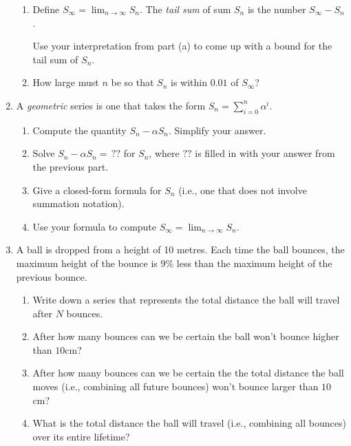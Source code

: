 \begin{enumerate}
\begin{enumerate}
            \item Define $S_\infty=\lim_{n\to\infty}S_n$. The \emph{tail sum} of sum $S_n$
			is the number $S_\infty - S_n$. 

			Use your interpretation from part (a) to come up with a bound for the tail sum of $S_n$.

            \item How large must $n$ be so that $S_n$ is within $0.01$ of $S_\infty$?
		\end{enumerate}

		\item A \emph{geometric} series is one that takes the form $\displaystyle S_n=\sum_{i=0}^n \alpha^i$.
		\begin{enumerate}
			\item Compute the quantity $S_n-\alpha S_n$. Simplify your answer.
			\item Solve $S_n-\alpha S_n=\,??$ for $S_n$, where $??$ is filled in with your answer from the previous part. 
			\item Give a closed-form formula for $S_n$ (i.e., one that does not involve summation notation).
			\item Use your formula to compute $S_\infty =\lim_{n\to\infty} S_n$.
		\end{enumerate}

        \item A ball is dropped from a height of 10 metres. Each time the ball bounces, the maximum height of the bounce is $9$\% less than the maximum height of the previous bounce. 
        
        \begin{enumerate}
            \item Write down a series that represents the total distance the ball will travel after $N$ bounces.
            \item After how many bounces can we be certain the ball won't bounce higher than $10$cm?
            \item After how many bounces can we be certain the the total distance the ball moves (i.e., combining all future bounces) won't bounce larger than $10$cm?
            \item What is the total distance the ball will travel (i.e., combining all bounces)
			over its entire lifetime?
        \end{enumerate}

\end{enumerate}